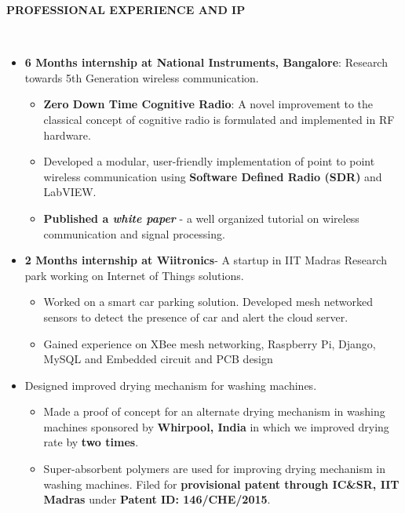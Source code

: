 \documentclass[a4paper,10pt]{article}
\newcommand{\lsep}{-0.5cm}
\newcommand{\resheading}[1]{{\small \colorbox{mygrey}{\begin{minipage}{0.975\textwidth}{\textbf{#1 \vphantom{p\^{E}}}}\end{minipage}}}}
\begin{document}
\resheading{\textbf{PROFESSIONAL EXPERIENCE AND IP} }\\[\lsep]
    \begin{itemize}
            \item \textbf{6 Months internship at National Instruments, Bangalore}: Research towards 5th Generation wireless communication.
        \begin{itemize}
            \vspace{-5pt}
            \item \textbf{Zero Down Time Cognitive Radio}: A novel improvement to the classical concept of cognitive radio is formulated and implemented in RF hardware.
            \item Developed a modular, user-friendly implementation of point to point wireless communication using \textbf{Software Defined Radio (SDR)} and LabVIEW.
            \item \textbf{Published a \textit{white paper}} - a well organized tutorial on wireless communication and signal processing.
        \end{itemize}
        \vspace{-5pt}
        \item \textbf{2 Months internship at Wiitronics}- A startup in IIT Madras Research park working on Internet of Things solutions.
        \vspace{-5pt}
        \begin{itemize}
            \setlength{\itemsep}{1pt}
            \item Worked on a smart car parking solution. Developed mesh networked sensors to detect the presence of car and alert the cloud server.
            \item Gained experience on XBee mesh networking, Raspberry Pi, Django, MySQL and Embedded circuit and PCB design
        \end{itemize}
        \vspace{-5pt}
        \item Designed improved drying mechanism for washing machines.
        \begin{itemize}
            \vspace{-5pt}
            \item Made a proof of concept for an alternate drying mechanism in washing machines sponsored by \textbf{Whirpool, India} in which we improved drying rate by \textbf{two times}.
            \item Super-absorbent polymers are used for improving drying mechanism in washing machines. Filed for \textbf{provisional patent through IC\&SR, IIT Madras} under \textbf{Patent ID: 146/CHE/2015}.
        \end{itemize} 
    \end{itemize}
\end{document}

